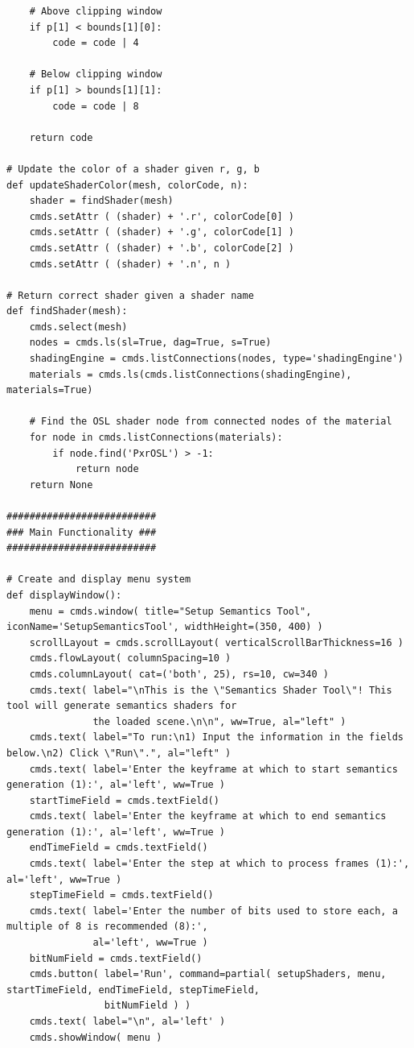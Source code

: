 \documentclass[conference]{IEEEtran}
\begin{document}
{{\begin{verbatim}
    # Above clipping window
    if p[1] < bounds[1][0]:
        code = code | 4
        
    # Below clipping window
    if p[1] > bounds[1][1]:
        code = code | 8
        
    return code
    
# Update the color of a shader given r, g, b
def updateShaderColor(mesh, colorCode, n):
    shader = findShader(mesh)
    cmds.setAttr ( (shader) + '.r', colorCode[0] )
    cmds.setAttr ( (shader) + '.g', colorCode[1] )
    cmds.setAttr ( (shader) + '.b', colorCode[2] ) 
    cmds.setAttr ( (shader) + '.n', n ) 
    
# Return correct shader given a shader name
def findShader(mesh):
    cmds.select(mesh)
    nodes = cmds.ls(sl=True, dag=True, s=True)
    shadingEngine = cmds.listConnections(nodes, type='shadingEngine')
    materials = cmds.ls(cmds.listConnections(shadingEngine), materials=True)
    
    # Find the OSL shader node from connected nodes of the material
    for node in cmds.listConnections(materials):
        if node.find('PxrOSL') > -1:
            return node
    return None

##########################
### Main Functionality ###
##########################

# Create and display menu system
def displayWindow():
    menu = cmds.window( title="Setup Semantics Tool", iconName='SetupSemanticsTool', widthHeight=(350, 400) )
    scrollLayout = cmds.scrollLayout( verticalScrollBarThickness=16 )
    cmds.flowLayout( columnSpacing=10 )
    cmds.columnLayout( cat=('both', 25), rs=10, cw=340 )
    cmds.text( label="\nThis is the \"Semantics Shader Tool\"! This tool will generate semantics shaders for
               the loaded scene.\n\n", ww=True, al="left" )
    cmds.text( label="To run:\n1) Input the information in the fields below.\n2) Click \"Run\".", al="left" )
    cmds.text( label='Enter the keyframe at which to start semantics generation (1):', al='left', ww=True )
    startTimeField = cmds.textField()
    cmds.text( label='Enter the keyframe at which to end semantics generation (1):', al='left', ww=True )
    endTimeField = cmds.textField()
    cmds.text( label='Enter the step at which to process frames (1):', al='left', ww=True )
    stepTimeField = cmds.textField()
    cmds.text( label='Enter the number of bits used to store each, a multiple of 8 is recommended (8):',
               al='left', ww=True )
    bitNumField = cmds.textField()
    cmds.button( label='Run', command=partial( setupShaders, menu, startTimeField, endTimeField, stepTimeField,
                 bitNumField ) )
    cmds.text( label="\n", al='left' )
    cmds.showWindow( menu )


\end{verbatim}}}
\end{document}
